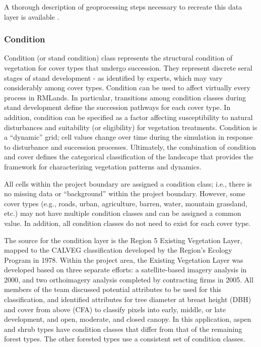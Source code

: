 A thorough description of geoprocessing steps necessary to recreate this data layer is available .

\subsubsection{Condition}
Condition (or stand condition) class represents the structural condition of vegetation for cover types that undergo succession. They represent discrete seral stages of stand development - as identified by experts, which may vary considerably among cover types. Condition can be used to affect virtually every process in RMLands. In particular, transitions among condition classes during stand development define the succession pathways for each cover type. In addition, condition can be specified as a factor affecting susceptibility to natural disturbances and suitability (or eligibility) for vegetation treatments. Condition is a “dynamic” grid; cell values change over time during the simulation in response to disturbance and succession processes. Ultimately, the combination of condition and cover defines the categorical classification of the landscape that provides the framework for characterizing vegetation patterns and dynamics.

All cells within the project boundary are assigned a condition class; i.e., there is no missing data or ``background'' within the project boundary. However, some cover types (e.g., roads, urban, agriculture, barren, water, mountain grassland, etc.) may not have multiple condition classes and can be assigned a common value. In addition, all condition classes do not need to exist for each cover type. 

The source for the condition layer is the Region 5 Existing Vegetation Layer, mapped to the CALVEG classification developed by the Region's Ecology Program in 1978. Within the project area, the Existing Vegetation Layer was developed based on three separate efforts: a satellite-based imagery analysis in 2000, and two orthoimagery analysis completed by contracting firms in 2005. All members of the team discussed potential attributes to be used for this classification, and identified attributes for tree diameter at breast height (DBH) and cover from above (CFA) to classify pixels into early, middle, or late development, and open, moderate, and closed canopy. In this application, aspen and shrub types have condition classes that differ from that of the remaining forest types. The other forested types use a consistent set of condition classes.

